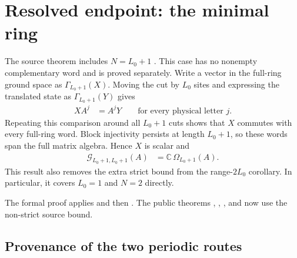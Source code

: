 \documentclass{article}
\begin{document}
\section{Resolved endpoint: the minimal ring}
\label{sec:cpgsv21_normal_range_reduction_minimal_ring}

The source theorem includes $N=L_0+1$ \cite{Cirac2021Matrix}. This case has no
nonempty complementary word and is proved separately. Write a vector in the
full-ring ground space as $\Gamma_{L_0+1}(X)$. Moving the cut by $L_0$ sites
and expressing the translated state as $\Gamma_{L_0+1}(Y)$ gives
\begin{align}
    XA^j
        &= A^jY
        \qquad\text{for every physical letter $j$}.
    \label{eq:cpgsv21_normal_range_reduction_full_ring_intertwining}
\end{align}
Repeating this comparison around all $L_0+1$ cuts shows that $X$ commutes with
every full-ring word. Block injectivity persists at length $L_0+1$, so these
words span the full matrix algebra. Hence $X$ is scalar and
\begin{align}
    \mathcal G_{L_0+1,L_0+1}(A)
        &= \mathbb C\,\Omega_{L_0+1}(A).
    \label{eq:cpgsv21_normal_range_reduction_minimal_ring_ground_space}
\end{align}
This result also removes the extra strict bound from the range-$2L_0$
corollary. In particular, it covers $L_0=1$ and $N=2$ directly.

The formal proof applies
 and then
.
The public theorems
,
,
, and
 now use the
non-strict source bound.

\subsection{Provenance of the two periodic routes}
\label{sec:cpgsv21_normal_range_reduction_route_provenance}
\end{document}

